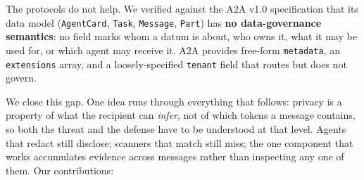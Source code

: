 \documentclass[sigconf,anonymous,review]{acmart}
\theoremstyle{acmplain}
\begin{document}
The protocols do not help. We verified against the A2A v1.0 specification that its
data model (\texttt{AgentCard}, \texttt{Task}, \texttt{Message}, \texttt{Part})
has \textbf{no data-governance semantics}: no field marks whom a datum is about,
who owns it, what it may be used for, or which agent may receive it. A2A provides
free-form \texttt{metadata}, an \texttt{extensions} array, and a loosely-specified
\texttt{tenant} field that routes but does not govern.

We close this gap. One idea runs through everything that follows: privacy is a
property of what the recipient can \emph{infer}, not of which tokens a message
contains, so both the threat and the defense have to be understood at that level.
Agents that redact still disclose; scanners that match still miss; the one
component that works accumulates evidence across messages rather than inspecting
any one of them. Our contributions:
\end{document}
